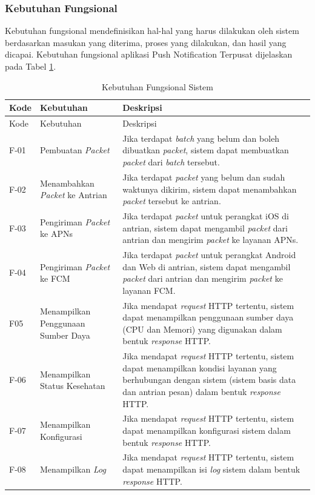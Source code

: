 \subsubsection{Kebutuhan Fungsional}
\par Kebutuhan fungsional mendefinisikan hal-hal yang harus dilakukan oleh sistem berdasarkan masukan yang diterima, proses yang dilakukan, dan hasil yang dicapai. Kebutuhan fungsional aplikasi Push Notification Terpusat dijelaskan pada Tabel \ref{t:fungsional}.
\begin{longtable}{|p{1cm}|p{3cm}|p{5cm}|}
    \caption{Kebutuhan Fungsional Sistem} \label{t:fungsional} \\ \hline
    \rowcolor{lightgray} Kode & {Kebutuhan} & Deskripsi \\ \hline
    \endfirsthead
    \hline
    \rowcolor{lightgray} Kode & {Kebutuhan} & Deskripsi \\ \hline
    \endhead
    F-01 & Pembuatan \textit{Packet} & Jika terdapat \textit{batch} yang belum dan boleh dibuatkan \textit{packet}, sistem dapat membuatkan \textit{packet} dari \textit{batch} tersebut. \\ \hline
    F-02 & Menambahkan \textit{Packet} ke Antrian & Jika terdapat \textit{packet} yang belum dan sudah waktunya dikirim, sistem dapat menambahkan \textit{packet} tersebut ke antrian. \\ \hline
    F-03 & Pengiriman \textit{Packet} ke APNs & Jika terdapat \textit{packet} untuk perangkat iOS di antrian, sistem dapat mengambil \textit{packet} dari antrian dan mengirim \textit{packet} ke layanan APNs. \\ \hline
    F-04 & Pengiriman \textit{Packet} ke FCM & Jika terdapat \textit{packet} untuk perangkat Android dan Web di antrian, sistem dapat mengambil \textit{packet} dari antrian dan mengirim \textit{packet} ke layanan FCM. \\ \hline
    F05 & Menampilkan Penggunaan Sumber Daya & Jika mendapat \textit{request} HTTP tertentu, sistem dapat menampilkan penggunaan sumber daya (CPU dan Memori) yang digunakan dalam bentuk \textit{response} HTTP. \\ \hline
    F-06 & Menampilkan Status Kesehatan & Jika mendapat \textit{request} HTTP tertentu, sistem dapat menampilkan kondisi layanan yang berhubungan dengan sistem (sistem basis data dan antrian pesan) dalam bentuk \textit{response} HTTP. \\ \hline
    F-07 & Menampilkan Konfigurasi & Jika mendapat \textit{request} HTTP tertentu, sistem dapat menampilkan konfigurasi sistem dalam bentuk \textit{response} HTTP. \\ \hline
    F-08 & Menampilkan \textit{Log} & Jika mendapat \textit{request} HTTP tertentu, sistem dapat menampilkan isi \textit{log} sistem dalam bentuk \textit{response} HTTP. \\ \hline
\end{longtable}

